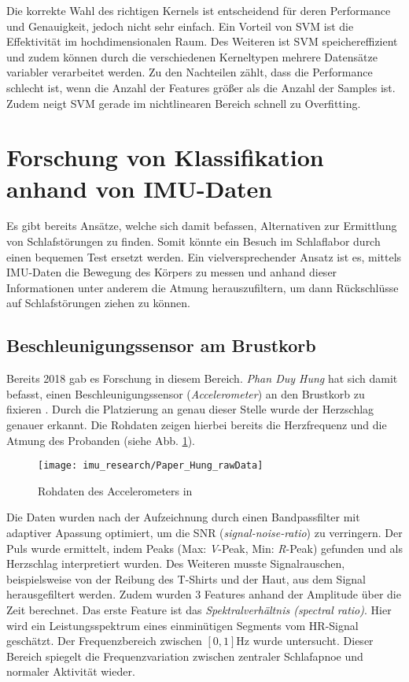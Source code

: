 Die korrekte Wahl des richtigen Kernels ist entscheidend für deren Performance und Genauigkeit, jedoch nicht sehr einfach.
Ein Vorteil von SVM ist die Effektivität im hochdimensionalen Raum.
Des Weiteren ist SVM speichereffizient und zudem können durch die verschiedenen Kerneltypen mehrere Datensätze variabler verarbeitet werden.
Zu den Nachteilen zählt, dass die Performance schlecht ist, wenn die Anzahl der Features größer als die Anzahl der Samples ist. 
Zudem neigt SVM gerade im nichtlinearen Bereich schnell zu Overfitting.

\section{Forschung von Klassifikation anhand von IMU-Daten}
Es gibt bereits Ansätze, welche sich damit befassen, Alternativen zur Ermittlung von Schlafstörungen zu finden. 
Somit könnte ein Besuch im Schlaflabor durch einen bequemen Test ersetzt werden. 
Ein vielversprechender Ansatz ist es, mittels IMU-Daten die Bewegung des Körpers zu messen und anhand dieser Informationen unter anderem die Atmung herauszufiltern, um dann Rückschlüsse auf Schlafstörungen ziehen zu können.

\subsection{Beschleunigungssensor am Brustkorb}
Bereits 2018 gab es Forschung in diesem Bereich. \textit{Phan Duy Hung} hat sich damit befasst, einen Beschleunigungssensor (\textit{Accelerometer}) an den Brustkorb zu fixieren \cite{hungCentralSleepApnea2018}.
Durch die Platzierung an genau dieser Stelle wurde der Herzschlag genauer erkannt. 
Die Rohdaten zeigen hierbei bereits die Herzfrequenz und die Atmung des Probanden (siehe Abb. \ref{imu_research_hung_rawData}). 

\begin{figure}[ht]
    \centering
    \texttt{[image: imu\_research/Paper\_Hung\_rawData]}
    \caption{Rohdaten des Accelerometers in \cite{hungCentralSleepApnea2018}}
    \label{imu_research_hung_rawData}
\end{figure}

Die Daten wurden nach der Aufzeichnung durch einen Bandpassfilter mit adaptiver Apassung optimiert, um die SNR (\textit{signal-noise-ratio}) zu verringern.
Der Puls wurde ermittelt, indem Peaks (Max: \textit{V}-Peak, Min: \textit{R}-Peak) gefunden und als Herzschlag interpretiert wurden.
Des Weiteren musste Signalrauschen, beispielsweise von der Reibung des T-Shirts und der Haut, aus dem Signal herausgefiltert werden. 
Zudem wurden 3 Features anhand der Amplitude über die Zeit berechnet. 
Das erste Feature ist das \textit{Spektralverhältnis (spectral ratio)}. 
Hier wird ein Leistungsspektrum eines einminütigen Segments vom HR-Signal geschätzt. 
Der Frequenzbereich zwischen $[0,1]\si{\hertz}$ wurde untersucht. 
Dieser Bereich spiegelt die Frequenzvariation zwischen zentraler Schlafapnoe und normaler Aktivität wieder.

